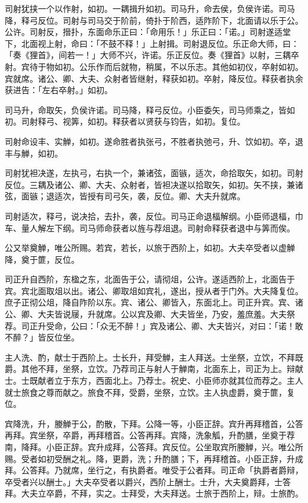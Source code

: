 \documentclass[]{article}
\begin{document}
司射犹挟一个以作射，如初。一耦揖升如初。司马升，命去侯，负侯许诺。司马降，释弓反位。司射与司马交于阶前，倚扑于阶西，适阼阶下，北面请以乐于公。公许。司射反，搢扑，东面命乐正曰：「命用乐！」乐正曰：「诺。」司射遂适堂下，北面视上射，命曰：「不鼓不释！」上射揖。司射退反位。乐正命大师，曰：「奏《狸首》，间若一！」大师不兴，许诺。乐正反位。奏《狸首》以射，三耦卒射。宾待于物如初。公乐作而后就物，稍属，不以乐志。其他如初仪，卒射如初。宾就席。诸公、卿、大夫、众射者皆继射，释获如初。卒射，降反位。释获者执余获进告：「左右卒射。」如初。

司马升，命取矢，负侯许诺。司马降，释弓反位。小臣委矢，司马师乘之，皆如初。司射释弓、视筭，如初。释获者以贤获与钧告，如初。复位。

司射命设丰、实觯，如初。遂命胜者执张弓，不胜者执弛弓，升、饮如初。卒，退丰与觯，如初。

司射犹袒决遂，左执弓，右执一个，兼诸弦，面镞，适次，命拾取矢，如初。司射反位。三耦及诸公、卿、大夫、众射者，皆袒决遂以拾取矢，如初。矢不挟，兼诸弦，面镞；退适次，皆授有司弓矢，袭，反位。卿、大夫升就席。

司射适次，释弓，说决拾，去扑，袭，反位。司马正命退楅解纲。小臣师退楅，巾车、量人解左下纲。司马师命获者以旌与荐俎退。司射命释获者退中与筭而俟。

公又举奠觯，唯公所赐。若宾，若长，以旅于西阶上，如初。大夫卒受者以虚觯降，奠于篚，反位。

司正升自西阶，东楹之东，北面告于公，请彻俎，公许。遂适西阶上，北面告于宾。宾北面取俎以出。诸公、卿取俎如宾礼，遂出，授从者于门外。大夫降复位。庶子正彻公俎，降自阼阶以东。宾、诸公、卿皆入，东面北上。司正升宾。宾、诸公、卿、大夫皆说屦，升就席。公以宾及卿、大夫皆坐，乃安，羞庶羞。大夫祭荐。司正升受命，公曰：「众无不醉！」宾及诸公、卿、大夫皆兴，对曰：「诺！敢不醉？」皆反位坐。

主人洗、酌，献士于西阶上。士长升，拜受觯，主人拜送。士坐祭，立饮，不拜既爵。其他不拜，坐祭，立饮。乃荐司正与射人于觯南，北面东上，司正为上。辩献士。士既献者立于东方，西面北上。乃荐士。祝史、小臣师亦就其位而荐之。主人就士旅食之尊而献之。旅食不拜，受爵，坐祭，立饮。主人执虚爵，奠于篚，复位。

宾降洗，升，媵觯于公，酌散，下拜。公降一等，小臣正辞。宾升再拜稽首，公答再拜。宾坐祭，卒爵，再拜稽首。公答再拜。宾降，洗象觚，升酌膳，坐奠于荐南，降拜。小臣正辞。宾升成拜，公答拜。宾反位。公坐取宾所媵觯，兴。唯公所赐。受者如初受酬之礼。降，更爵，洗；升酌膳；下，再拜稽首。小臣正辞，升成拜。公答拜。乃就席，坐行之，有执爵者。唯受于公者拜。司正命「执爵者爵辩，卒受者兴以酬士。」大夫卒受者以爵兴，西阶上酬士。士升，大夫奠爵拜，士答拜。大夫立卒爵，不拜，实之。士拜受，大夫拜送。士旅于西阶上，辩。士旅酌。
\end{document}

